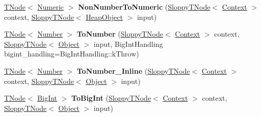 \begin{DoxyCompactItemize}
\mbox{\hyperlink{classv8_1_1internal_1_1compiler_1_1TNode}{T\+Node}}$<$ \mbox{\hyperlink{structv8_1_1internal_1_1UnionT}{Numeric}} $>$ {\bfseries Non\+Number\+To\+Numeric} (\mbox{\hyperlink{classv8_1_1internal_1_1compiler_1_1SloppyTNode}{Sloppy\+T\+Node}}$<$ \mbox{\hyperlink{classv8_1_1internal_1_1Context}{Context}} $>$ context, \mbox{\hyperlink{classv8_1_1internal_1_1compiler_1_1SloppyTNode}{Sloppy\+T\+Node}}$<$ \mbox{\hyperlink{classv8_1_1internal_1_1HeapObject}{Heap\+Object}} $>$ input)
\item 
\mbox{\label{classv8_1_1internal_1_1CodeStubAssembler_a07010e0cc1126c5c30815254e93de7e2}} 
\mbox{\hyperlink{classv8_1_1internal_1_1compiler_1_1TNode}{T\+Node}}$<$ \mbox{\hyperlink{structv8_1_1internal_1_1UnionT}{Number}} $>$ {\bfseries To\+Number} (\mbox{\hyperlink{classv8_1_1internal_1_1compiler_1_1SloppyTNode}{Sloppy\+T\+Node}}$<$ \mbox{\hyperlink{classv8_1_1internal_1_1Context}{Context}} $>$ context, \mbox{\hyperlink{classv8_1_1internal_1_1compiler_1_1SloppyTNode}{Sloppy\+T\+Node}}$<$ \mbox{\hyperlink{classv8_1_1internal_1_1Object}{Object}} $>$ input, Big\+Int\+Handling bigint\+\_\+handling=Big\+Int\+Handling\+::k\+Throw)
\item 
\mbox{\label{classv8_1_1internal_1_1CodeStubAssembler_a833328f5fe6b4ebf25023f8e1cd80eaa}} 
\mbox{\hyperlink{classv8_1_1internal_1_1compiler_1_1TNode}{T\+Node}}$<$ \mbox{\hyperlink{structv8_1_1internal_1_1UnionT}{Number}} $>$ {\bfseries To\+Number\+\_\+\+Inline} (\mbox{\hyperlink{classv8_1_1internal_1_1compiler_1_1SloppyTNode}{Sloppy\+T\+Node}}$<$ \mbox{\hyperlink{classv8_1_1internal_1_1Context}{Context}} $>$ context, \mbox{\hyperlink{classv8_1_1internal_1_1compiler_1_1SloppyTNode}{Sloppy\+T\+Node}}$<$ \mbox{\hyperlink{classv8_1_1internal_1_1Object}{Object}} $>$ input)
\item 
\mbox{\label{classv8_1_1internal_1_1CodeStubAssembler_a305db105c555dc4fa1c67ff4b7ae8723}} 
\mbox{\hyperlink{classv8_1_1internal_1_1compiler_1_1TNode}{T\+Node}}$<$ \mbox{\hyperlink{classv8_1_1internal_1_1BigInt}{Big\+Int}} $>$ {\bfseries To\+Big\+Int} (\mbox{\hyperlink{classv8_1_1internal_1_1compiler_1_1SloppyTNode}{Sloppy\+T\+Node}}$<$ \mbox{\hyperlink{classv8_1_1internal_1_1Context}{Context}} $>$ context, \mbox{\hyperlink{classv8_1_1internal_1_1compiler_1_1SloppyTNode}{Sloppy\+T\+Node}}$<$ \mbox{\hyperlink{classv8_1_1internal_1_1Object}{Object}} $>$ input)

\end{DoxyCompactItemize}
